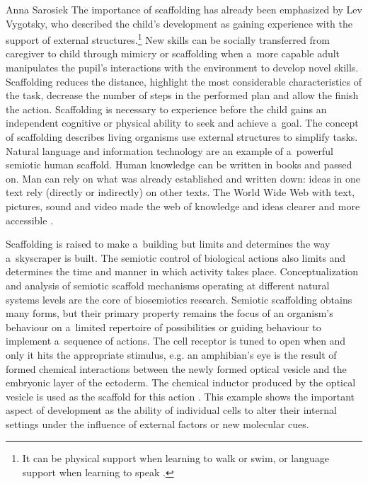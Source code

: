 \begin{artengenv}{Anna Sarosiek}
The importance of scaffolding has already been emphasized by Lev Vygotsky, who described the child’s development as gaining experience with the support of external structures.\footnote{It can be physical support when learning to walk or swim, or language support when learning to speak
\parencite[][]{vygotsky_thought_1964}.%
} New skills can be socially transferred from caregiver to child through mimicry or scaffolding when a~more capable adult manipulates the pupil’s interactions with the environment to develop novel skills. Scaffolding reduces the distance, highlight the most considerable characteristics of the task, decrease the number of steps in the performed plan and allow the finish the action. Scaffolding is necessary to experience before the child gains an independent cognitive or physical ability to seek and achieve a~goal. The concept of scaffolding describes living organisms use external structures to simplify tasks. Natural language and information technology are an example of a~powerful semiotic human scaffold. Human knowledge can be written in books and passed on. Man can rely on what was already established and written down: ideas in one text rely (directly or indirectly) on other texts. The World Wide Web with text, pictures, sound and video made the web of knowledge and ideas clearer and more accessible 
\parencite[][]{clark_natural-born_2004}.%


Scaffolding is raised to make a~building but limits and determines the way a~skyscraper is built. The semiotic control of biological actions also limits and determines the time and manner in which activity takes place. Conceptualization and analysis of semiotic scaffold mechanisms operating at different natural systems levels are the core of biosemiotics research. Semiotic scaffolding obtains many forms, but their primary property remains the focus of an organism’s behaviour on a~limited repertoire of possibilities or guiding behaviour to implement a~sequence of actions. The cell receptor is tuned to open when and only it hits the appropriate stimulus, e.g. an amphibian’s eye is the result of formed chemical interactions between the newly formed optical vesicle and the embryonic layer of the ectoderm. The chemical inductor produced by the optical vesicle is used as the scaffold for this action
\parencite[][]{kull_catalysis_2014}. %
 This example shows the important aspect of development as the ability of individual cells to alter their internal settings under the influence of external factors or new molecular cues.


\end{artengenv}
